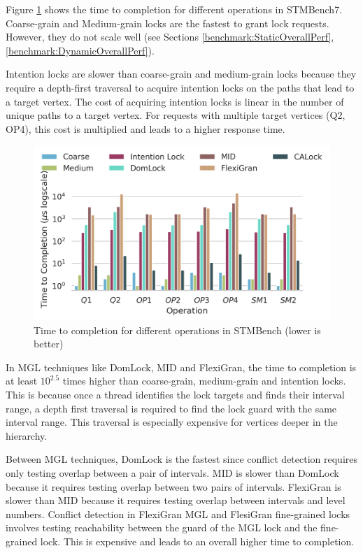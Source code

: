 Figure \ref{ttc} shows the time to completion for different operations in STMBench7. 
Coarse-grain and Medium-grain locks are the fastest to grant lock requests. However, they do not scale well (see Sections \ref{benchmark:StaticOverallPerf}, \ref{benchmark:DynamicOverallPerf}). 

Intention locks are slower than coarse-grain and medium-grain locks because they require a depth-first traversal to acquire intention locks on the paths that lead to a target vertex. The cost of acquiring intention locks is linear in the number of unique paths to a target vertex. For requests with multiple target vertices (Q2, OP4), this cost is multiplied and leads to a higher response time. 

\begin{figure}[h]
	\captionsetup{justification=centering}
	\centering
	\includegraphics[width=.8\columnwidth]{figures/PerformanceCharts/TTC}
	\caption{Time to completion for different operations in STMBench (lower is better)}
	\label{ttc}
\end{figure}

In MGL techniques like DomLock, MID and FlexiGran, the time to completion is at least $10^{2.5}$ times higher than coarse-grain, medium-grain and intention locks. This is because once a thread identifies the lock targets and finds their interval range, a depth first traversal is required to find the lock guard with the same interval range. This traversal is especially expensive for vertices deeper in the hierarchy.


Between MGL techniques, DomLock is the fastest since conflict detection requires only testing overlap between a pair of intervals. MID is slower than DomLock because it requires testing overlap between two pairs of intervals. FlexiGran is slower than MID because it requires testing overlap between intervals and level numbers. Conflict detection in FlexiGran MGL and FlesiGran fine-grained locks involves testing reachability between the guard of the MGL lock and the fine-grained lock. This is expensive and leads to an overall higher time to completion.

